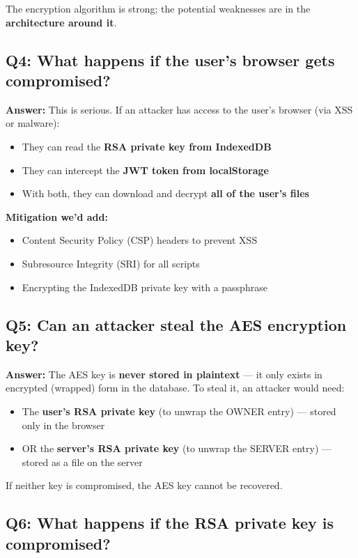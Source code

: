 \documentclass[11pt,a4paper]{article}
\begin{document}
The encryption algorithm is strong; the potential weaknesses are in the \textbf{architecture around it}.

\subsection{Q4: What happens if the user's browser gets compromised?}

\textbf{Answer:} This is serious. If an attacker has access to the user's browser (via XSS or malware):
\begin{itemize}
  \item They can read the \textbf{RSA private key from IndexedDB}
  \item They can intercept the \textbf{JWT token from localStorage}
  \item With both, they can download and decrypt \textbf{all of the user's files}
\end{itemize}

\textbf{Mitigation we'd add:}
\begin{itemize}
  \item Content Security Policy (CSP) headers to prevent XSS
  \item Subresource Integrity (SRI) for all scripts
  \item Encrypting the IndexedDB private key with a passphrase
\end{itemize}

\subsection{Q5: Can an attacker steal the AES encryption key?}

\textbf{Answer:} The AES key is \textbf{never stored in plaintext} --- it only exists in encrypted (wrapped) form in the database. To steal it, an attacker would need:
\begin{itemize}
  \item The \textbf{user's RSA private key} (to unwrap the OWNER entry) --- stored only in the browser
  \item OR the \textbf{server's RSA private key} (to unwrap the SERVER entry) --- stored as a file on the server
\end{itemize}

If neither key is compromised, the AES key cannot be recovered.

\subsection{Q6: What happens if the RSA private key is compromised?}
\end{document}
